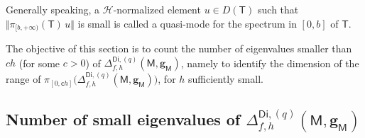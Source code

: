 \documentclass[10pt]{amsart}
\newcommand{\mbf}[1]{\mathbf{#1}}
\theoremstyle{plain}
\theoremstyle{definition}
\begin{document}
Generally speaking, a $\mathcal H$-normalized element $u\in D\left (\mathsf T\right)$
such that $\Vert \pi_{[b,+\infty)} (\mathsf T) \, u \Vert$ is small is
called a quasi-mode for the spectrum in $[0,b]$ of $\mathsf T$.

The objective of this section is to count
the number of eigenvalues smaller than $ch$ (for some $c>0$) of
$\Delta_{f,h}^{\mathsf{Di},(q)}(\mathsf M,\mbf g_{\mathsf M})$,
namely to identify the dimension of the range of $\pi_{[0,\mathsf
ch]}\bigl(\Delta_{f,h}^{\mathsf{Di},(q)}(\mathsf M,\mbf g_{\mathsf
M}) \bigr)$, for $h$ sufficiently small.

\subsection{Number of small eigenvalues of
$\Delta_{f,h}^{\mathsf{Di},(q)}(\mathsf M,\mbf g_{\mathsf M})$}
\label{sec.mainresult_petitevp}
\end{document}
